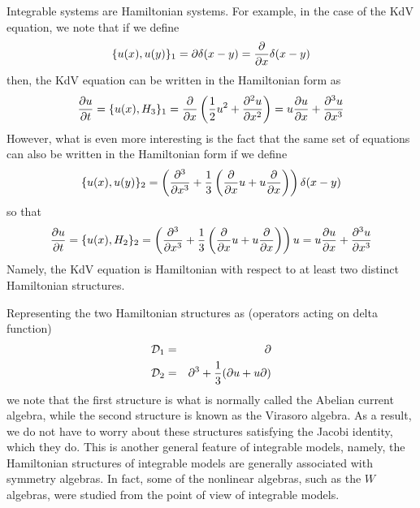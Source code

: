 \documentclass[a4paper,11pt]{article}
\begin{document}
Integrable systems are Hamiltonian systems. For example, in the case
of the KdV equation, we note that if we define
\begin{equation}
\{u(x) , u(y) \}_{1} = \partial \delta (x-y) = {\partial \over \partial x}
\delta (x-y)
\end{equation}
then, the KdV equation can be written in the Hamiltonian form as
\begin{equation}
{\partial u\over \partial t} = \{ u (x) , H_{3}\}_{1} = {\partial\over
\partial x} \left({1\over 2} u^{2} + {\partial^{2} u\over \partial
x^{2}}\right) = u {\partial u\over \partial x} + {\partial^{3} u\over
\partial x^{3}}
\end{equation} 
However, what is even more interesting is the fact that the same set
of equations can also be written in the Hamiltonian form if we define
\begin{equation}
\{ u(x) , u(y) \}_{2} = \left({\partial^{3}\over \partial x^{3}} +
{1\over 3} \left({\partial\over \partial x} u + u {\partial\over
\partial x}\right)\right) \delta (x-y)
\end{equation}
so that
\begin{equation}
{\partial u\over \partial t} = \{ u(x) , H_{2}\}_{2} =
\left({\partial^{3}\over \partial x^{3}} + {1\over
3}\left({\partial\over \partial x} u + u {\partial\over \partial
x}\right)\right) u = u {\partial u\over \partial x} + {\partial^{3}
u\over \partial x^{3}}
\end{equation}
Namely, the KdV equation is Hamiltonian with respect to at least two
distinct Hamiltonian structures.

Representing the two Hamiltonian structures as (operators acting on
delta function)
\begin{eqnarray}
{\cal D}_{1} & = & \partial\nonumber\\
{\cal D}_{2} & = & \partial^{3} + {1\over 3} (\partial u + u \partial)
\end{eqnarray}
we note that the first structure is what is normally called the
Abelian current algebra, while the second structure is known as the
Virasoro algebra. As a result, we do not have to worry about these
structures satisfying the Jacobi identity, which they do. This is
another general feature of integrable models, namely, the Hamiltonian
structures of integrable models are generally associated with
symmetry algebras. In fact, some of the nonlinear algebras, such as
the $W$ algebras, were studied from the point of view of integrable
models. 
\end{document}
